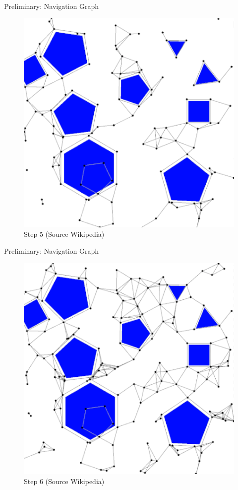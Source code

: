 \documentclass[ignorenonframetext,aspectratio=169,]{paradise-slide}
\begin{document}
\begin{frame}[fragile]{Preliminary: Navigation Graph}
\protect\hypertarget{preliminary-navigation-graph-4}{}

\begin{figure}
\centering
\includegraphics{PRM-4.png}
\caption{Step 5 (Source Wikipedia)}
\end{figure}

\addtocounter{framenumber}{-1}

\end{frame}

\begin{frame}[fragile]{Preliminary: Navigation Graph}
\protect\hypertarget{preliminary-navigation-graph-5}{}

\begin{figure}
\centering
\includegraphics{PRM-7.png}
\caption{Step 6 (Source Wikipedia)}
\end{figure}

\addtocounter{framenumber}{-1}

\end{frame}
\end{document}
